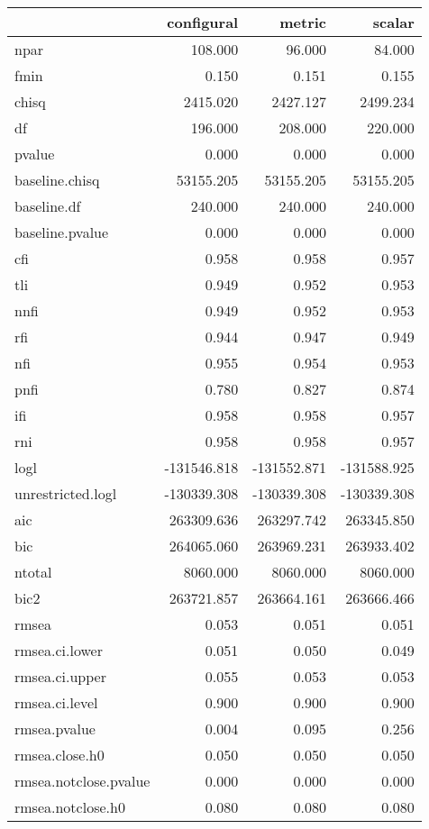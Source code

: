 \documentclass[
  letterpaper,
  DIV=11,
  numbers=noendperiod]{scrartcl}
\begin{document}
\begin{longtable}[]{@{}lrrr@{}}
\toprule\noalign{}
& configural & metric & scalar \\
\midrule\noalign{}
\endhead
\bottomrule\noalign{}
\endlastfoot
npar & 108.000 & 96.000 & 84.000 \\
fmin & 0.150 & 0.151 & 0.155 \\
chisq & 2415.020 & 2427.127 & 2499.234 \\
df & 196.000 & 208.000 & 220.000 \\
pvalue & 0.000 & 0.000 & 0.000 \\
baseline.chisq & 53155.205 & 53155.205 & 53155.205 \\
baseline.df & 240.000 & 240.000 & 240.000 \\
baseline.pvalue & 0.000 & 0.000 & 0.000 \\
cfi & 0.958 & 0.958 & 0.957 \\
tli & 0.949 & 0.952 & 0.953 \\
nnfi & 0.949 & 0.952 & 0.953 \\
rfi & 0.944 & 0.947 & 0.949 \\
nfi & 0.955 & 0.954 & 0.953 \\
pnfi & 0.780 & 0.827 & 0.874 \\
ifi & 0.958 & 0.958 & 0.957 \\
rni & 0.958 & 0.958 & 0.957 \\
logl & -131546.818 & -131552.871 & -131588.925 \\
unrestricted.logl & -130339.308 & -130339.308 & -130339.308 \\
aic & 263309.636 & 263297.742 & 263345.850 \\
bic & 264065.060 & 263969.231 & 263933.402 \\
ntotal & 8060.000 & 8060.000 & 8060.000 \\
bic2 & 263721.857 & 263664.161 & 263666.466 \\
rmsea & 0.053 & 0.051 & 0.051 \\
rmsea.ci.lower & 0.051 & 0.050 & 0.049 \\
rmsea.ci.upper & 0.055 & 0.053 & 0.053 \\
rmsea.ci.level & 0.900 & 0.900 & 0.900 \\
rmsea.pvalue & 0.004 & 0.095 & 0.256 \\
rmsea.close.h0 & 0.050 & 0.050 & 0.050 \\
rmsea.notclose.pvalue & 0.000 & 0.000 & 0.000 \\
rmsea.notclose.h0 & 0.080 & 0.080 & 0.080 \\

\end{longtable}
\end{document}
